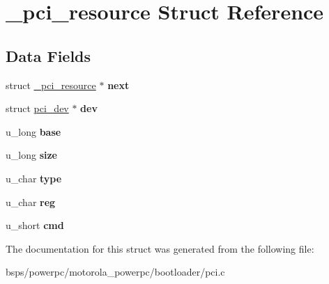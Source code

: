 \hypertarget{struct__pci__resource}{}\section{\+\_\+pci\+\_\+resource Struct Reference}
\label{struct__pci__resource}
\subsection*{Data Fields}
\begin{DoxyCompactItemize}
\item 
\mbox{\label{struct__pci__resource_ad6393940a4608b672cc75c2beeccdd75}} 
struct \mbox{\hyperlink{struct__pci__resource}{\+\_\+pci\+\_\+resource}} $\ast$ {\bfseries next}
\item 
\mbox{\label{struct__pci__resource_abf1d41cfd762f7b623e1d083e11dda8a}} 
struct \mbox{\hyperlink{structpci__dev}{pci\+\_\+dev}} $\ast$ {\bfseries dev}
\item 
\mbox{\label{struct__pci__resource_af4e2da67b15e99ba493521507d84fd6b}} 
u\+\_\+long {\bfseries base}
\item 
\mbox{\label{struct__pci__resource_a8855981fcce1f917453d4d836dea4520}} 
u\+\_\+long {\bfseries size}
\item 
\mbox{\label{struct__pci__resource_a832ae652102e6819aaef6e502d0e62b4}} 
u\+\_\+char {\bfseries type}
\item 
\mbox{\label{struct__pci__resource_a42ecf92eda35ab5edfd419c0578e5e20}} 
u\+\_\+char {\bfseries reg}
\item 
\mbox{\label{struct__pci__resource_a58061d4039e63643aa229901ebe5e0e5}} 
u\+\_\+short {\bfseries cmd}
\end{DoxyCompactItemize}


The documentation for this struct was generated from the following file\+:\begin{DoxyCompactItemize}
\item 
bsps/powerpc/motorola\+\_\+powerpc/bootloader/pci.\+c\end{DoxyCompactItemize}
